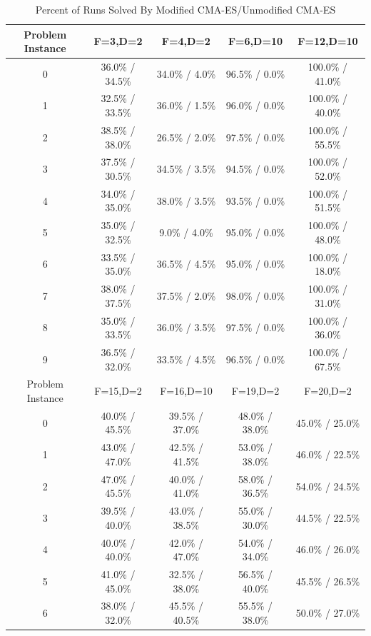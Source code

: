\documentclass[sigconf]{acmart}
\begin{document}
\begin{table}
	\centering
	\caption{Percent of Runs Solved By Modified CMA-ES/Unmodified CMA-ES}
	\label{tab:experiment3Results}
	\begin{tabular}{c|c|c|c|c}
		\toprule
		Problem Instance & F=3,D=2 & F=4,D=2 & F=6,D=10 & F=12,D=10\\
		\hline
		0 & 36.0\% / 34.5\% & 34.0\% / 4.0\% & 96.5\% / 0.0\% & 100.0\% / 41.0\%\\
		\hline
		1 & 32.5\% / 33.5\% & 36.0\% / 1.5\% & 96.0\% / 0.0\% & 100.0\% / 40.0\%\\
		\hline
		2 & 38.5\% / 38.0\% & 26.5\% / 2.0\% & 97.5\% / 0.0\% & 100.0\% / 55.5\%\\
		\hline
		3 & 37.5\% / 30.5\% & 34.5\% / 3.5\% & 94.5\% / 0.0\% & 100.0\% / 52.0\%\\
		\hline
		4 & 34.0\% / 35.0\% & 38.0\% / 3.5\% & 93.5\% / 0.0\% & 100.0\% / 51.5\%\\
		\hline
		5 & 35.0\% / 32.5\% & 9.0\% / 4.0\% & 95.0\% / 0.0\% & 100.0\% / 48.0\%\\
		\hline
		6 & 33.5\% / 35.0\% & 36.5\% / 4.5\% & 95.0\% / 0.0\% & 100.0\% / 18.0\%\\
		\hline
		7 & 38.0\% / 37.5\% & 37.5\% / 2.0\% & 98.0\% / 0.0\% & 100.0\% / 31.0\%\\
		\hline
		8 & 35.0\% / 33.5\% & 36.0\% / 3.5\% & 97.5\% / 0.0\% & 100.0\% / 36.0\%\\
		\hline
		9 & 36.5\% / 32.0\% & 33.5\% / 4.5\% & 96.5\% / 0.0\% & 100.0\% / 67.5\%\\
		\hline
		\hline
		Problem Instance & F=15,D=2 & F=16,D=10 & F=19,D=2 & F=20,D=2\\
		\hline
		0 & 40.0\% / 45.5\% & 39.5\% / 37.0\% & 48.0\% / 38.0\% & 45.0\% / 25.0\%\\
		\hline
		1 & 43.0\% / 47.0\% & 42.5\% / 41.5\% & 53.0\% / 38.0\% & 46.0\% / 22.5\%\\
		\hline
		2 & 47.0\% / 45.5\% & 40.0\% / 41.0\% & 58.0\% / 36.5\% & 54.0\% / 24.5\%\\
		\hline
		3 & 39.5\% / 40.0\% & 43.0\% / 38.5\% & 55.0\% / 30.0\% & 44.5\% / 22.5\%\\
		\hline
		4 & 40.0\% / 40.0\% & 42.0\% / 47.0\% & 54.0\% / 34.0\% & 46.0\% / 26.0\%\\
		\hline
		5 & 41.0\% / 45.0\% & 32.5\% / 38.0\% & 56.5\% / 40.0\% & 45.5\% / 26.5\%\\
		\hline
		6 & 38.0\% / 32.0\% & 45.5\% / 40.5\% & 55.5\% / 38.0\% & 50.0\% / 27.0\%\\

\end{tabular}
\end{table}
\end{document}
